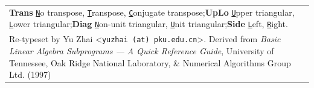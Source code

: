 \documentclass[10pt,a3paper, landscape]{article}
\newcommand{\key}[1]{\underline{\texttt{#1}}}
\begin{document}
\begin{tabular}{ll>{\ttfamily}l}
		\multicolumn{3}{l}{\small\textbf{Trans}\; \key{N}o transpose, \key{T}ranspose, \key{C}onjugate transpose;\quad \textbf{UpLo}\; \key{U}pper triangular, \key{L}ower triangular;\quad\textbf{Diag}\; \key{N}on-unit triangular, \key{U}nit triangular;\quad\textbf{Side}\; \key{L}eft, \key{R}ight.}                                                                                    \\
		\multicolumn{3}{l}{\scriptsize Re-typeset by Yu Zhai <\texttt{yuzhai (at) pku.edu.cn}>. Derived from \emph{Basic Linear Algebra Subprograms --- A Quick Reference Guide}, University of Tennessee, Oak Ridge National Laboratory, \& Numerical Algorithms Group Ltd. (1997)}
	\end{tabular}
		

	
	
	
	
\end{document}
